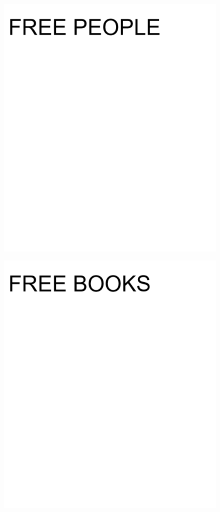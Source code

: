 \documentclass[17pt]{extreport}
\begin{document}
        \begin{figure}
		\centering
		\includegraphics[width=8.0in]{imageset/uploadimages/freepeople.png}
	\end{figure}	
        \begin{figure}
		\centering
		\includegraphics[width=8.0in]{imageset/uploadimages/freebooks.png}
	\end{figure}	
\end{document}
